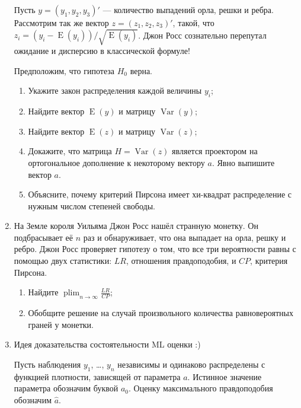\documentclass[12pt]{article}
\DeclareMathOperator{\Var}{Var}
\DeclareMathOperator{\E}{E}
\DeclareMathOperator{\plim}{plim}
\begin{document}
\begin{enumerate}
Пусть $y = (y_1, y_2, y_3)'$ — количество выпадений орла, решки и ребра. Рассмотрим так же вектор
$z = (z_1, z_2, z_3)'$, такой, что $z_i = (y_i - \E(y_i)) / \sqrt{\E(y_i)}$. 
Джон Росс сознательно перепутал ожидание и дисперсию в классической формуле!

Предположим, что гипотеза $H_0$ верна.
\begin{enumerate}
    \item Укажите закон распределения каждой величины $y_i$;
    \item Найдите вектор $\E(y)$ и матрицу $\Var(y)$;
    \item Найдите вектор $\E(z)$ и матрицу $\Var(z)$;
    \item Докажите, что матрица $H=\Var(z)$ является проектором на ортогональное дополнение к некоторому вектору $a$. 
  Явно выпишите вектор $a$.
  \item Объясните, почему критерий Пирсона имеет хи-квадрат распределение с нужным числом степеней свободы.
\end{enumerate}

\newpage

\item На Земле короля Уильяма Джон Росс нашёл странную монетку. 
Он подбрасывает её $n$ раз и обнаруживает, что она выпадает на орла, решку и ребро. 
Джон Росс проверяет гипотезу о том, что все три вероятности равны с помощью двух статистики: 
$LR$, отношения правдоподобия, и $CP$, критерия Пирсона. 

\begin{enumerate}
\item Найдите $\plim_{n\to\infty} \frac{LR}{CP}$;
\item Обобщите решение на случай произвольного количества равновероятных граней у монетки.    
\end{enumerate}

\item Идея доказательства состоятельности ML оценки :)

Пусть наблюдения $y_1$, \ldots, $y_n$ независимы и одинаково распределены с функцией плотности, зависящей от параметра $a$.
Истинное значение параметра обозначим буквой $a_0$. Оценку максимального правдоподобия обозначим $\hat a$.


\end{enumerate}
\end{document}
